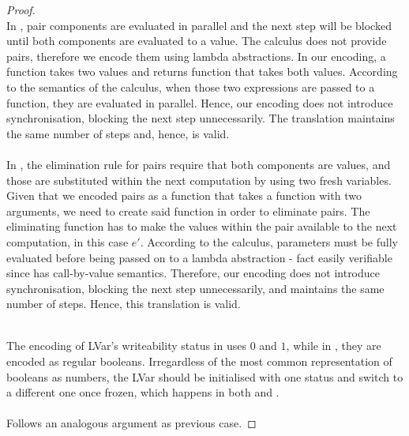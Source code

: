 \documentclass[main.tex]{subfiles}
\begin{document}
\begin{proof}
  
   \\
  In \typedlvar, pair components are evaluated in parallel and the next step will
  be blocked until both components are evaluated to a value. The \lvar calculus
  does not provide pairs, therefore we encode them using lambda abstractions.
  In our encoding, a function takes two values and returns function that takes
  both values. According to the semantics of the \lvar \mspc calculus, when those two
  expressions are passed to a function, they are evaluated in parallel. Hence,
  our encoding does not introduce synchronisation, blocking the next step
  unnecessarily. The translation maintains the same number of steps and, hence,
  is valid. \\
  
   \\
  In \typedlvar, the elimination rule for pairs require that both components are 
  values, and those are substituted within the next computation by using two
  fresh variables. Given that we encoded pairs as a function that takes a
  function with two arguments, we need to create said function in order to
  eliminate pairs. The eliminating function has to make the values within the
  pair available to the next computation, in this case $e'$. According to the
  \lvar calculus, parameters must be fully evaluated before being passed on to a
  lambda abstraction - fact easily verifiable since \lvar \mspc has call-by-value
  semantics. Therefore, our encoding does not introduce synchronisation, blocking
  the next step unnecessarily, and maintains the same number of steps. Hence,
  this translation is valid. \\
  


   \\
  The encoding of LVar's writeability status in \typedlvar uses $0$ and $1$,
  while in \lvar, they are encoded as regular booleans. Irregardless of the most
  common representation of booleans as numbers, the LVar should be initialised
  with one status and switch to a different one once frozen, which happens in
  both \lvar and \typedlvar.\\

  \\
  Follows an analogous argument as previous case.
  
\end{proof}
\end{document}
